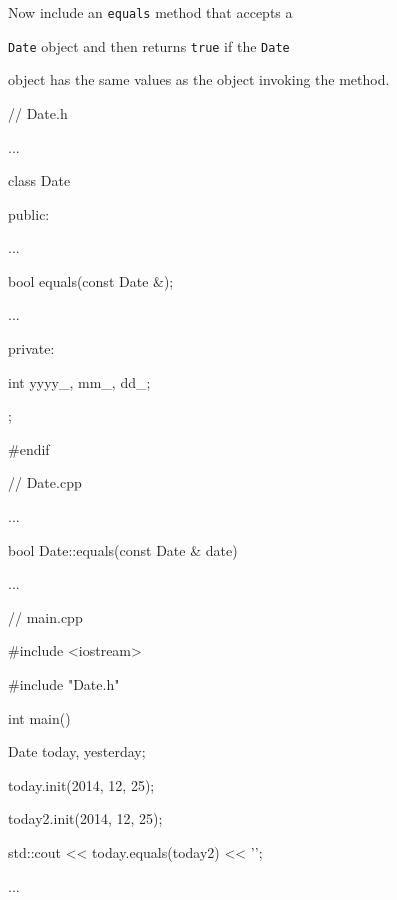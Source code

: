 Now include an \texttt{equals} method that accepts a

\texttt{Date} object and then returns \texttt{true} if the \texttt{Date}

object has the same values as the object invoking the method.



\begin{consolethree}[escapeinside=||]

// Date.h

...

class Date

{

public:

    ...

    bool equals(const Date &);

    ...

private:

    int yyyy_, mm_, dd_;

};



#endif

\end{consolethree}



\begin{consolethree}[escapeinside=||]

// Date.cpp

...

bool Date::equals(const Date & date)

{

}

...

\end{consolethree}



\begin{consolethree}[escapeinside=||]

// main.cpp

#include <iostream>

#include "Date.h"



int main()

{

    Date today, yesterday;

    today.init(2014, 12, 25);

    today2.init(2014, 12, 25);

    std::cout << today.equals(today2) << '\n';

    ...

}

\end{consolethree}

